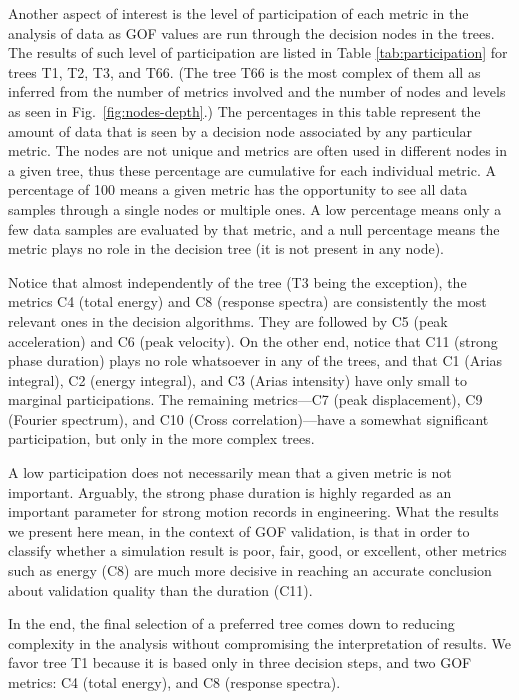 Another aspect of interest is the level of participation of each metric in the analysis of data as GOF values are run through the decision nodes in the trees. The results of such level of participation are listed in Table \ref{tab:participation} for trees T1, T2, T3, and T66. (The tree T66 is the most complex of them all as inferred from the number of metrics involved and the number of nodes and levels as seen in Fig.~\ref{fig:nodes-depth}.) The percentages in this table represent the amount of data that is seen by a decision node associated by any particular metric. The nodes are not unique and metrics are often used in different nodes in a given tree, thus these percentage are cumulative for each individual metric. A percentage of 100 means a given metric has the opportunity to see all data samples through a single nodes or multiple ones. A low percentage means only a few data samples are evaluated by that metric, and a null percentage means the metric plays no role in the decision tree (it is not present in any node).

Notice that almost independently of the tree (T3 being the exception), the metrics C4 (total energy) and C8 (response spectra) are consistently the most relevant ones in the decision algorithms. They are followed by C5 (peak acceleration) and C6 (peak velocity). On the other end, notice that C11 (strong phase duration) plays no role whatsoever in any of the trees, and that C1 (Arias integral), C2 (energy integral), and C3 (Arias intensity) have only small to marginal participations. The remaining metrics---C7 (peak displacement), C9 (Fourier spectrum), and C10 (Cross correlation)---have a somewhat significant participation, but only in the more complex trees.

A low participation does not necessarily mean that a given metric is not important. Arguably, the strong phase duration is highly regarded as an important parameter for strong motion records in engineering. What the results we present here mean, in the context of GOF validation, is that in order to classify whether a simulation result is poor, fair, good, or excellent, other metrics such as energy (C8) are much more decisive in reaching an accurate conclusion about validation quality than the duration (C11).

In the end, the final selection of a preferred tree comes down to reducing complexity in the analysis without compromising the interpretation of results. We favor tree T1 because it is based only in three decision steps, and two GOF metrics: C4 (total energy), and C8 (response spectra).

